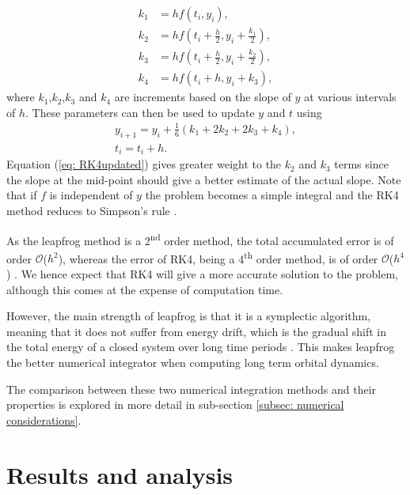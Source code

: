 \documentclass[12pt]{article} %
\numberwithin{equation}{subsection} %
\begin{document}
\begin{equation}
    \begin{aligned}
    k_{1}&=hf\left(t_{i},y_{i}\right), \\
    k_{2}&=hf\left(t_{i}+\frac{h}{2},y_{i}+\frac{k_{1}}{2}\right), \\
    k_{3}&=hf\left(t_{i}+\frac{h}{2},y_{i}+\frac{k_{2}}{2}\right), \\
    k_{4}&=hf\left(t_{i}+h,y_{i}+k_{3}\right),
    \end{aligned}
\end{equation}
where $k_{1}$,$k_{2}$,$k_{3}$ and $k_{4}$ are increments based on the slope of $y$ at various intervals of $h$. These parameters can then be used to update $y$ and $t$ using \cite[p; 328]{suli2003introduction} 
\begin{equation}
    \begin{gathered}
    y_{i+1}=y_{i}+\frac{1}{6}(k_{1}+2k_{2}+2k_{3}+k_{4}), \\
    t_{i}=t_{i}+h.
    \end{gathered} \label{eq: RK4updated}
\end{equation}
Equation (\ref{eq: RK4updated}) gives greater weight to the $k_{2}$ and $k_{3}$ terms since the slope at the mid-point should give a better estimate of the actual slope. Note that if $f$ is independent of $y$ the problem becomes a simple integral and the RK4 method reduces to Simpson's rule \cite[p; 328]{suli2003introduction}. \par
As the leapfrog method is a 2\textsuperscript{nd} order method, the total accumulated error is of order $\mathcal{O}$($h^{2}$), whereas the error of RK4, being a 4\textsuperscript{th} order method, is of order $\mathcal{O}$($h^{4}$) \cite{sandvik2015numerical}. We hence expect that RK4 will give a more accurate solution to the problem, although this comes at the expense of computation time. \par 
However, the main strength of leapfrog is that it is a symplectic algorithm, meaning that it does not suffer from energy drift, which is the gradual shift in the total energy of a closed system over long time periods \cite[p; 11]{young2014leapfrog}. This makes leapfrog the better numerical integrator when computing long term orbital dynamics. \par
The comparison between these two numerical integration methods and their properties is explored in more detail in sub-section \ref{subsec: numerical considerations}.

\section{Results and analysis} \label{Sec: Results and Analysis}
\FloatBarrier
\end{document}
